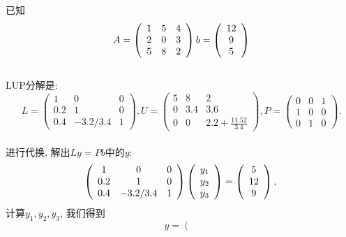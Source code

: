 \documentclass[a4paper, justified]{tufte-handout}
\begin{document}
\begin{solution}
  已知
  $$
    A=\left(\begin{array}{ccc}
      1 & 5 & 4 \\
      2 & 0 & 3 \\
      5 & 8 & 2
    \end{array}\right)\\
    b = \left(\begin{array}{c}
      12 \\
      9  \\
      5
    \end{array}\right)$$
  \\LUP分解是:
  \\
  $$L=\left(\begin{array}{ccc}
      1   & 0        & 0 \\
      0.2 & 1        & 0 \\
      0.4 & -3.2/3.4 & 1
    \end{array}\right),
    U=\left(\begin{array}{ccc}
      5 & 8   & 2                     \\
      0 & 3.4 & 3.6                   \\
      0 & 0   & 2.2+\frac{11.52}{3.4}
    \end{array}\right),
    P=\left(\begin{array}{ccc}
      0 & 0 & 1 \\
      1 & 0 & 0 \\
      0 & 1 & 0
    \end{array}\right).$$\\
  进行代换, 解出$Ly=Pb$中的$y$:
  $$\left(\begin{array}{ccc}
      1   & 0        & 0 \\
      0.2 & 1        & 0 \\
      0.4 & -3.2/3.4 & 1
    \end{array}\right)
    \left(\begin{array}{c}
      y_1 \\
      y_2 \\
      y_3
    \end{array}\right)=
    \left(\begin{array}{c}
      5  \\
      12 \\
      9
    \end{array}\right),\\
  $$
  计算$y_1,y_2,y_3$, 我们得到
  $$
    y=\left(\begin{array}{c}

\end{array}$$
\end{solution}
\end{document}
